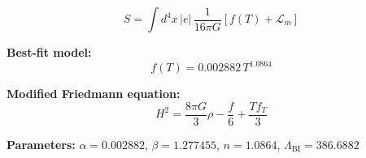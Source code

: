 
\begin{equation}
  S = \int d^4x \, |e| \, \frac{1}{16\pi G} \left[ f(T) + \mathcal{L}_m \right]
\end{equation}

\textbf{Best-fit model:}
\begin{equation}
  f(T) = 0.002882 \, T^{1.0864}
\end{equation}

\textbf{Modified Friedmann equation:}
\begin{equation}
  H^2 = \frac{8\pi G}{3} \rho - \frac{f}{6} + \frac{T f_T}{3}
\end{equation}

\textbf{Parameters:}
$\alpha = 0.002882$, \quad
$\beta = 1.277455$, \quad
$n = 1.0864$, \quad
$\Lambda_{\text{BI}} = 386.6882$